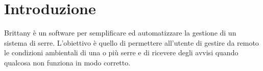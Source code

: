 \section{Introduzione}
Brittany è un software per semplificare ed automatizzare la gestione di un sistema di serre. L'obiettivo è quello di permettere all'utente di gestire da remoto le condizioni ambientali di una o più serre e di ricevere degli avvisi quando qualcosa non funziona in modo corretto.
